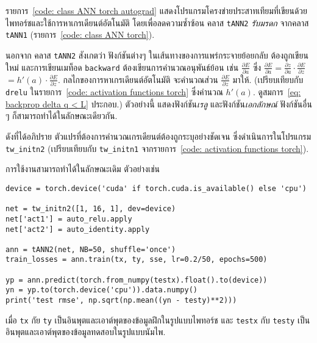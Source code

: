 \begin{Exercise}
	\label{ex: torch mnist GPU autograd}

รายการ~\ref{code: class ANN torch autograd}
แสดงโปรแกรมโครงข่ายประสาทเทียมที่เขียนด้วยไพทอร์ชและใช้การหาเกรเดียนต์อัตโนมัติ
โดยเพื่อลดความซ้ำซ้อน
คลาส \texttt{tANN2} \textit{รับมรดก} จากคลาส \texttt{tANN1} (รายการ~\ref{code: class ANN torch}).

นอกจาก คลาส \texttt{tANN2}
สังเกตว่า 
ฟังก์ชันต่างๆ ในเส้นทางของการแพร่กระจายย้อยกลับ ต้องถูกเขียนใหม่
และการเขียนเมท็อด \verb|backward| ต้องเขียนการคำนวณอนุพันธ์ย้อน
เช่น $\frac{\partial E}{\partial a}$
ซึ่ง $\frac{\partial E}{\partial a} = \frac{\partial z}{\partial a} \cdot \frac{\partial E}{\partial z}$
$=h'(a) \cdot \frac{\partial E}{\partial z}$.
กลไกของการหาเกรเดียนต์อัตโนมัติ จะคำนวณส่วน $\frac{\partial E}{\partial z}$ มาให้.
(เปรียบเทียบกับ \texttt{drelu} ในรายการ~\ref{code: activation functions torch} ซึ่งคำนวณ $h'(a)$.
ดูสมการ~\ref{eq: backprop delta q < L} ประกอบ.) 
%
ตัวอย่างนี้ แสดงฟังก์ชัน\textit{เรลู} และฟังก์ชัน\textit{เอกลักษณ์}
ฟังก์ชันอื่น ๆ ก็สามารถทำได้ในลักษณะเดียวกัน. %

ดังที่ได้อภิปราย ตัวแปรที่ต้องการคำนวณเกรเดียนต์ต้องถูกระบุอย่างชัดเจน
ซึ่งดำเนินการในโปรแกรม \verb|tw_initn2| (เปรียบเทียบกับ \verb|tw_initn1| จากรายการ~\ref{code: activation functions torch}).

การใช้งานสามารถทำได้ในลักษณะเดิม ตัวอย่างเช่น
\begin{Verbatim}[fontsize=\small]
device = torch.device('cuda' if torch.cuda.is_available() else 'cpu')

net = tw_initn2([1, 16, 1], dev=device)
net['act1'] = auto_relu.apply
net['act2'] = auto_identity.apply

ann = tANN2(net, NB=50, shuffle='once')
train_losses = ann.train(tx, ty, sse, lr=0.2/50, epochs=500)

yp = ann.predict(torch.from_numpy(testx).float().to(device))
yn = yp.to(torch.device('cpu')).data.numpy()
print('test rmse', np.sqrt(np.mean((yn - testy)**2)))
\end{Verbatim}
เมื่อ \texttt{tx} กัย \texttt{ty} เป็นอินพุตและเอาต์พุตของข้อมูลฝึกในรูปแบบไพทอร์ช
และ 
\texttt{testx} กับ \texttt{testy} เป็นอินพุตและเอาต์พุตของข้อมูลทดสอบในรูปแบบนัมไพ.


\end{Exercise}
